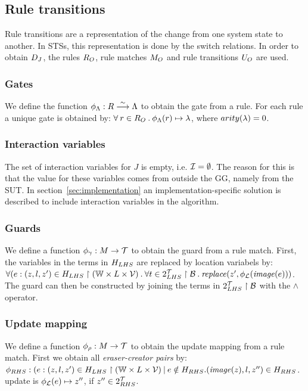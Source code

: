 \subsection{Rule transitions}
Rule transitions are a representation of the change from one system state to another. In STSs, this representation is done by the switch relations. In order to obtain $D_J$, the rules $R_O$, rule matches $M_O$ and rule transitions $U_O$ are used.

\subsubsection{Gates}
We define the function $\phi_\Lambda: R \stackrel{\sim}{\longrightarrow} \Lambda$ to obtain the gate from a rule. For each rule a unique gate is obtained by: $\forall\:r \in R_O\: . \: \phi_\Lambda(r) \mapsto \lambda$, where $arity(\lambda) = 0$.

\subsubsection{Interaction variables}
The set of interaction variables for $J$ is empty, i.e. $\mathcal{I} = \emptyset$. The reason for this is that the value for these variables comes from outside the GG, namely from the SUT. In section~\ref{sec:implementation} an implementation-specific solution is described to include interaction variables in the algorithm. 

\subsubsection{Guards}
We define a function $\phi_\gamma: M \rightarrow \mathcal{T}$ to obtain the guard from a rule match. First, the variables in the terms in $H_{LHS}$ are replaced by location variabels by: $\forall (e:(z, l, z') \in H_{LHS}\restriction (\mathbb{W} \times L \times \mathcal{V})\: .\: \forall t \in 2^{\mathcal{T}}_{LHS}\restriction\mathcal{B}\: .\: \mathit{replace}(z', \phi_{\mathcal{L}}(\mathit{image}(e)))$. The guard can then be constructed by joining the terms in $2^{\mathcal{T}}_{LHS}\restriction\mathcal{B}$ with the $\land$ operator.

\subsubsection{Update mapping}
We define a function $\phi_\rho: M \rightarrow \mathcal{T}$ to obtain the update mapping from a rule match. First we obtain all \textit{eraser-creator pairs} by: $\phi_{RHS}: (e:(z, l, z') \in H_{LHS}\restriction (\mathbb{W} \times L \times \mathcal{V})\: |\: e \notin H_{RHS} . (\mathit{image}(z), l, z'') \in H_{RHS}$. update is $\phi_{\mathcal{L}}(e) \mapsto z''$, if $z'' \in 2^{\mathcal{T}}_{RHS}$.

